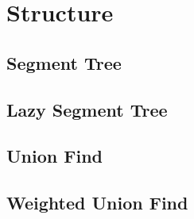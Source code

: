\section{Structure}

\subsection{Segment Tree}


\subsection{Lazy Segment Tree}


\subsection{Union Find}


\subsection{Weighted Union Find}

